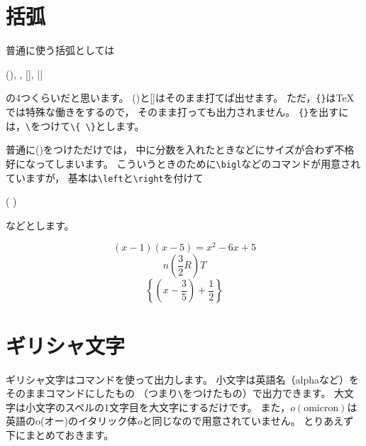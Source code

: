 \section{括弧}
普通に使う括弧としては
\begin{ITeX}
(), {}, [], ||
\end{ITeX}
の4つくらいだと思います。
()と[]はそのまま打てば出せます。
ただ，\verb|{}|は{\TeX}では特殊な働きをするので，
そのまま打っても出力されません。
\verb|{}|を出すには，\verb|\|をつけて\verb|\{ \}|とします。

普通に()をつけただけでは，
中に分数を入れたときなどにサイズが合わず不格好になってしまいます。
こういうときのために\verb|\bigl|などのコマンドが用意されていますが，
基本は\verb|\left|と\verb|\right|を付けて
\begin{ITeX}
\left( \right)
\end{ITeX}
などとします。

\begin{IOTeX*}
\[ (x - 1)(x - 5) = x^2 - 6x + 5 \]
\[ n \left( \frac{3}{2} R \right) T  \]
\[ \left\{ \left( x - \frac{3}{5} \right) + \frac{1}{2} \right\} \]
\end{IOTeX*}



\section{ギリシャ文字}
ギリシャ文字はコマンドを使って出力します。
小文字は英語名（alphaなど）をそのままコマンドにしたもの
（つまり\verb|\|をつけたもの）で出力できます。
大文字は小文字のスペルの1文字目を大文字にするだけです。
また，$o (\text{omicron})$は英語のo(オー)のイタリック体\textit{o}と同じなので用意されていません。
とりあえず下にまとめておきます。

